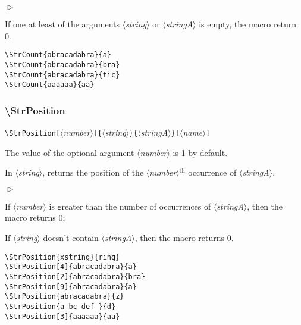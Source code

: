 \documentclass[a4paper,10pt]{article}
\newcommand\argu[1]{$\langle$\textit{#1}$\rangle$}
\newcommand\ARGU[1]{\texttt{\{}\argu{#1}\texttt{\}}}
\newcommand\arguC[1]{\texttt{[}\argu{#1}\texttt{]}}
\newenvironment{Conditions}[1][1cm]%
{\begin{list}%
	{$\vartriangleright$}%
	{\setlength{\leftmargin}{#1}
	 \setlength{\itemsep}{0pt}
	 \setlength{\parsep}{0pt}
	 \setlength{\topsep}{2ptplus3ptminus2pt}
	}}%
{\end{list}}
\renewcommand\th{${}^\text{th}$\xspace}
\newcommand\styleexemple{\small\vskip4pt}
\newcommand\verbinline{\lstinline[basicstyle=\normalsize\ttfamily]}
\begin{document}
\begin{Conditions}
\item If one at least of the arguments \argu{string} or \argu{stringA} is empty, the macro return 0.
\end{Conditions}

\begin{minipage}[t]{0.65\linewidth}
\begin{lstlisting}
\StrCount{abracadabra}{a}
\StrCount{abracadabra}{bra}
\StrCount{abracadabra}{tic}
\StrCount{aaaaaa}{aa}
\end{lstlisting}%
\end{minipage}\hfill
\begin{minipage}[t]{0.35\linewidth}
	\styleexemple
	\par
	\par
	\par
\end{minipage}%

\subsubsection{\ttfamily\textbackslash StrPosition}

\verbinline|\StrPosition|\arguC{number}\ARGU{string}\ARGU{stringA}\arguC{name}
\smallskip

The value of the optional argument \argu{number} is 1 by default.\par\smallskip

In \argu{string}, returns the position of the \argu{number}\th occurrence of \argu{stringA}.\medskip

\begin{Conditions}
\item If \argu{number} is greater than the number of occurrences of \argu{stringA}, then the macro returns 0;
\item If \argu{string} doesn't contain \argu{stringA}, then the macro returns 0.
\end{Conditions}
\medskip

\begin{minipage}[t]{0.65\linewidth}
\begin{lstlisting}
\StrPosition{xstring}{ring}
\StrPosition[4]{abracadabra}{a}
\StrPosition[2]{abracadabra}{bra}
\StrPosition[9]{abracadabra}{a}
\StrPosition{abracadabra}{z}
\StrPosition{a bc def }{d}
\StrPosition[3]{aaaaaa}{aa}
\end{lstlisting}%
\end{minipage}\hfill
\begin{minipage}[t]{0.35\linewidth}
	\styleexemple
	\par
	\par
	\par
	\par
	\par
	\par
\end{minipage}%
\end{document}
